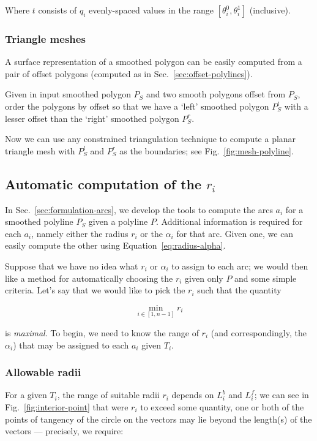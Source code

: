 \documentclass{article}
\begin{document}
Where $t$ consists of $q_i$ evenly-spaced values in the range $\left[\theta^0_i, \theta^1_i\right]$ (inclusive).

\subsubsection{Triangle meshes}

A surface representation of a smoothed polygon can be easily computed from a pair of offset polygons (computed as in Sec.~\ref{sec:offset-polylines}).

Given in input smoothed polygon $P_S$ and two smooth polygons offset from $P_S$, order the polygons by offset so that we have a `left' smoothed polygon $P^l_S$ with a lesser offset than the `right' smoothed polygon $P^r_S$.

Now we can use any constrained triangulation technique to compute a planar triangle mesh with $P^l_S$ and $P^r_S$ as the boundaries; see Fig.~\ref{fig:mesh-polyline}.

\subsection{Automatic computation of the $r_i$}

In Sec.~\ref{sec:formulation-arcs}, we develop the tools to compute the arcs $a_{i}$ for a smoothed polyline $P_{S}$ given a polyline $P$.  Additional information is required for each $a_{i}$, namely either the radius $r_{i}$ or the $\alpha_i$ for that arc.  Given one, we can easily compute the other using Equation~\eqref{eq:radius-alpha}.

Suppose that we have no idea what $r_{i}$ or $\alpha_{i}$ to assign to each arc; we would then like a method for automatically choosing the $r_{i}$ given only $P$ and some simple criteria.  Let's say that we would like to pick the $r_{i}$ such that the quantity

\begin{equation}
  \label{eq:optimize-radius}
  \min_{i \in [1, n-1]} r_{i}
\end{equation}

is \emph{maximal}.  To begin, we need to know the range of $r_{i}$ (and correspondingly, the $\alpha_{i}$) that may be assigned to each $a_{i}$ given $T_{i}$.

\subsubsection{Allowable radii}
\label{sec:allowable-radii}
For a given $T_{i}$, the range of suitable radii $r_{i}$ depends on $L^b_i$ and $L^f_i$; we can see in Fig.~\ref{fig:interior-point} that were $r_{i}$ to exceed some quantity, one or both of the points of tangency of the circle on the vectors may lie beyond the length(s) of the vectors --- precisely, we require:
\end{document}
